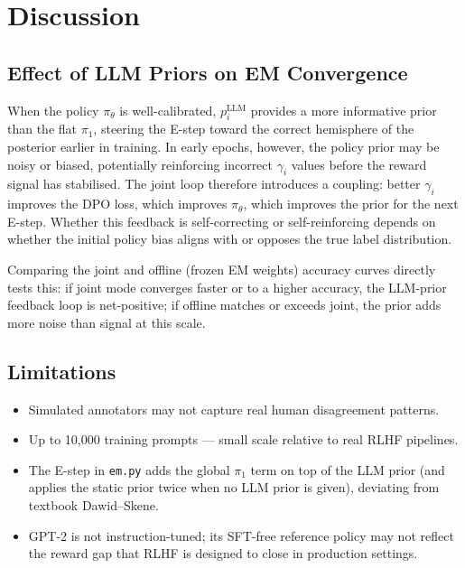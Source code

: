 \documentclass[11pt, a4paper]{article}
\begin{document}
\section{Discussion}

\subsection{Effect of LLM Priors on EM Convergence}

When the policy $\pi_\theta$ is well-calibrated, $p_i^\text{LLM}$ provides a more
informative prior than the flat $\pi_1$, steering the E-step toward the correct hemisphere
of the posterior earlier in training. In early epochs, however, the policy prior may be
noisy or biased, potentially reinforcing incorrect $\gamma_i$ values before the reward
signal has stabilised. The joint loop therefore introduces a coupling: better $\gamma_i$
improves the DPO loss, which improves $\pi_\theta$, which improves the prior for the next
E-step. Whether this feedback is self-correcting or self-reinforcing depends on whether
the initial policy bias aligns with or opposes the true label distribution.

Comparing the joint and offline (frozen EM weights) accuracy curves directly tests this: if
joint mode converges faster or to a higher accuracy, the LLM-prior feedback loop is
net-positive; if offline matches or exceeds joint, the prior adds more noise than signal at
this scale.

\subsection{Limitations}

\begin{itemize}[noitemsep]
  \item Simulated annotators may not capture real human disagreement patterns.
  \item Up to 10,000 training prompts --- small scale relative to real RLHF pipelines.
  \item The E-step in \texttt{em.py} adds the global $\pi_1$ term on top of the LLM prior
        (and applies the static prior twice when no LLM prior is given), deviating from
        textbook Dawid--Skene.
  \item GPT-2 is not instruction-tuned; its SFT-free reference policy may not reflect the
        reward gap that RLHF is designed to close in production settings.
\end{itemize}
\end{document}
